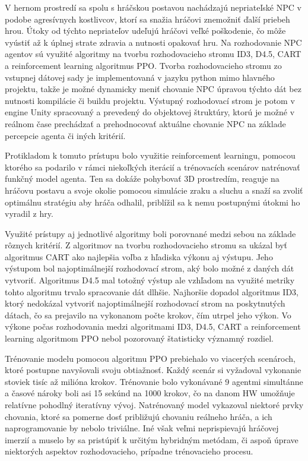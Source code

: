 \documentclass[slovak, master]{diploma}
\begin{document}
V hernom prostredí sa spolu s hráčskou postavou nachádzajú nepriateľské NPC v podobe agresívnych kostlivcov, ktorí sa snažia hráčovi znemožniť ďalší priebeh hrou. Útoky od týchto nepriateľov udeľujú hráčovi veľké poškodenie, čo môže vyústiť až k úplnej strate zdravia a nutnosti opakovať hru. Na rozhodovanie NPC agentov sú využité algoritmy na tvorbu rozhodovacieho stromu ID3, D4.5, CART a reinforcement learning algoritmus PPO. Tvorba rozhodovacieho stromu zo vstupnej dátovej sady je implementovaná v jazyku python mimo hlavného projektu, takže je možné dynamicky meniť chovanie NPC úpravou týchto dát bez nutnosti kompilácie či buildu projektu. Výstupný rozhodovací strom je potom v engine Unity spracovaný a prevedený do objektovej štruktúry, ktorú je možné v reálnom čase prechádzať a prehodnocovať aktuálne chovanie NPC na základe percepcie agenta či iných kritérií. 

Protikladom k tomuto prístupu bolo využitie reinforcement learningu, pomocou ktorého sa podarilo v rámci niekoľkých iterácií a trénovacích scenárov natrénovať funkčný model agenta. Ten sa dokáže pohybovať 3D prostredím, reaguje na hráčovu postavu a svoje okolie pomocou simulácie zraku a sluchu a snaží sa zvoliť optimálnu stratégiu aby hráča odhalil, priblížil sa k nemu postupnými útokmi ho vyradil z hry.

Využité prístupy aj jednotlivé algoritmy boli porovnané medzi sebou na základe rôznych kritérií. Z algoritmov na tvorbu rozhodovacieho stromu sa ukázal byť algoritmus CART ako najlepšia voľba z hľadiska výkonu aj výstupu. Jeho výstupom bol najoptimálnejší rozhodovací strom, aký bolo možné z daných dát vytvoriť. Algoritmus D4.5 mal totožný výstup ale vzhľadom na využité metriky tohto algoritmu trvalo spracovanie dát dlhšie. Najhoršie dopadol algoritmus ID3, ktorý nedokázal vytvoriť najoptimálnejší rozhodovací strom na poskytnutých dátach, čo sa prejavilo na vykonanom počte krokov, čím utrpel jeho výkon. Vo výkone počas rozhodovania medzi algoritmami ID3, D4.5, CART a reinforcement learning algoritmom PPO nebol pozorovaný štatisticky významný rozdiel. 

Trénovanie modelu pomocou algoritmu PPO prebiehalo vo viacerých scenároch, ktoré postupne navyšovali svoju obtiažnosť. Každý scenár si vyžadoval vykonanie stoviek tisíc až milióna krokov. Trénovanie bolo vykonávané 9 agentmi simultánne a časové nároky boli asi 15 sekúnd na 1000 krokov, čo na danom HW umožňuje relatívne pohodlný iteratívny vývoj. Natrénovaný model vykazoval niektoré prvky chovania, ktoré sa pomerne dosť približujú chovaniu reálneho hráča, a ich naprogramovanie by nebolo triviálne. Iné však veľmi neprispievajú hráčovej imerzií a muselo by sa pristúpiť k určitým hybridným metódam, či aspoň úprave niektorých aspektov rozhodovacieho, prípadne trénovacieho procesu. 
\end{document}
